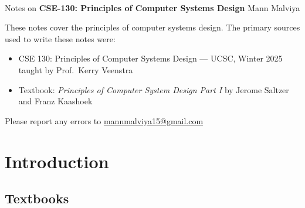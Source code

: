 \documentclass{article}
\begin{document}
\thispagestyle{empty}
\bigskip \
\vspace{0.1cm}

\begin{center}
{\fontsize{22}{22} \selectfont Notes on}
\vskip 16pt
{\fontsize{20}{20} \selectfont \bf \sffamily CSE-130: Principles of Computer Systems Design}
\vskip 24pt
{\fontsize{18}{18} \selectfont \rmfamily Mann Malviya}
\vskip 6pt
{\fontsize{14}{14} \selectfont {}}
\vskip 24pt
\end{center}

{\parindent0pt \baselineskip=15.5pt These notes cover the principles of computer systems design. The primary sources used to write these notes were:

\begin{itemize}
    \item CSE 130: Principles of Computer Systems Design — UCSC, Winter 2025 taught by Prof.\ Kerry Veenstra
    \item Textbook: \textit{Principles of Computer System Design Part I} by Jerome Saltzer and Franz Kaashoek
\end{itemize}

Please report any errors to \href{mailto:mannmalviya15@gmail.com}{mannmalviya15@gmail.com}

}

\newpage
\tableofcontents
\newpage

\section*{Introduction}
 
\subsection*{Textbooks}
\end{document}
